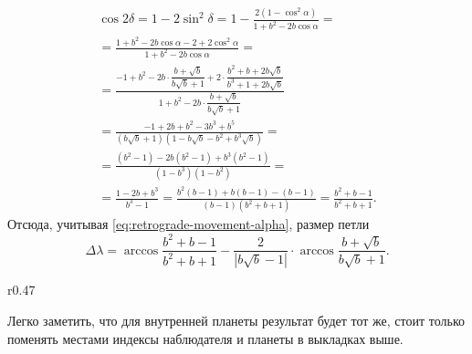 \begin{multline*}
    \cos 2 \delta 
        = 1 - 2 \sin^2 \delta 
        = 1 - \frac{2(1 - \cos^2 \alpha)}{1 + b^2 - 2b \cos \alpha} = \\
        =\frac{1 + b^2 - 2 b \cos \alpha - 2 + 2 \cos^2 \alpha}{1 + b^2 - 2b\cos \alpha} =\\
        = \frac{-1 + b^2 - 2b \cdot \dfrac{b + \sqrt{b}}{b \sqrt{b} + 1} + 2 \cdot \dfrac{b^2 + b +2b\sqrt{b}}{b^3 + 1 + 2 b \sqrt{b}}}{1 + b^2 - 2b \cdot \dfrac{b + \sqrt{b}}{b \sqrt{b} + 1}}\\
        = \frac{-1 + 2b + b^2 - 3b^3 + b^5}{\left(b \sqrt{b} + 1\right) \left(1 - b \sqrt{b} - b^2 + b^3 \sqrt{b}\right)} = \\
        = \frac{(b^2 - 1) - 2b(b^2 - 1) + b^3(b^2 - 1)}{(1 - b^3)(1 - b^2)} = \\
        = \frac{1 - 2b + b^3}{b^3 - 1} = \frac{b^2(b-1) + b(b-1) - (b - 1)}{\left(b-1\right)\left(b^2 + b + 1\right)} = \frac{b^2 + b - 1}{b^2 + b + 1}.
\end{multline*} 
Отсюда, учитывая \eqref{eq:retrograde-movement-alpha}, размер петли
\begin{equation}
    \Delta\lambda = \arccos \frac{b^2 + b - 1}{b^2 + b + 1} - \frac{2}{\left|b\sqrt{b} - 1 \right|} \cdot \arccos \frac{b + \sqrt{b}}{b \sqrt{b} + 1}.
\end{equation}

\begin{wrapfigure}[9]{r}{0.47\tw}
	\centering
	\vspace{-1pc}
	\caption{}
\end{wrapfigure}
Легко заметить, что для внутренней планеты результат будет тот же, стоит только поменять местами индексы наблюдателя и планеты в выкладках выше. 








